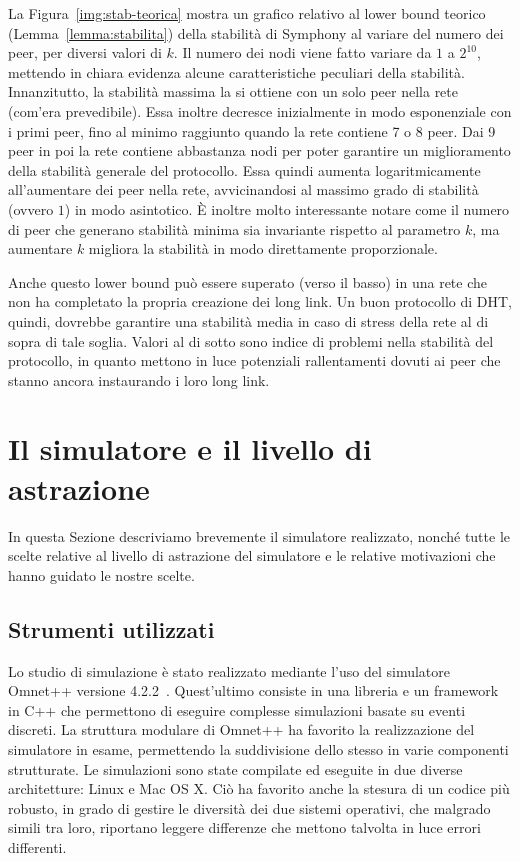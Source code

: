 \documentclass[prodmode,acmtap]{acmlarge}
\begin{document}
La Figura~\ref{img:stab-teorica} mostra un grafico relativo al lower bound teorico (Lemma~\ref{lemma:stabilita}) della stabilità di Symphony al variare del numero dei peer, per diversi valori di $k$. Il numero dei nodi viene fatto variare da $1$ a $2^{10}$, mettendo in chiara evidenza alcune caratteristiche peculiari della stabilità. Innanzitutto, la stabilità massima la si ottiene con un solo peer nella rete (com'era prevedibile). Essa inoltre decresce inizialmente in modo esponenziale con i primi peer, fino al minimo raggiunto quando la rete contiene 7 o 8 peer. Dai 9 peer in poi la rete contiene abbastanza nodi per poter garantire un miglioramento della stabilità generale del protocollo. Essa quindi aumenta logaritmicamente all'aumentare dei peer nella rete, avvicinandosi al massimo grado di stabilità (ovvero $1$) in modo asintotico. È inoltre molto interessante notare come il numero di peer che generano stabilità minima sia invariante rispetto al parametro $k$, ma aumentare $k$ migliora la stabilità in modo direttamente proporzionale. 

Anche questo lower bound può essere superato (verso il basso) in una rete che non ha completato la propria creazione dei long link. Un buon protocollo di DHT, quindi, dovrebbe garantire una stabilità media in caso di stress della rete al di sopra di tale soglia. Valori al di sotto sono indice di problemi nella stabilità del protocollo, in quanto mettono in luce potenziali rallentamenti dovuti ai peer che stanno ancora instaurando i loro long link.












\section{Il simulatore e il livello di astrazione} \label{simulatore}
In questa Sezione descriviamo brevemente il simulatore realizzato, nonché tutte le scelte relative al livello di astrazione del simulatore e le relative motivazioni che hanno guidato le nostre scelte.


\subsection{Strumenti utilizzati}

Lo studio di simulazione è stato realizzato mediante l'uso del simulatore Omnet++ versione 4.2.2~\cite{omnet++}. Quest'ultimo consiste in una libreria e un framework in C++ che permettono di eseguire complesse simulazioni basate su eventi discreti. La struttura modulare di Omnet++ ha favorito la realizzazione del simulatore in esame, permettendo la suddivisione dello stesso in varie componenti strutturate. Le simulazioni sono state compilate ed eseguite in due diverse architetture: Linux e Mac OS X. Ciò ha favorito anche la stesura di un codice più robusto, in grado di gestire le diversità dei due sistemi operativi, che malgrado simili tra loro, riportano leggere differenze che mettono talvolta in luce errori differenti.
\end{document}
